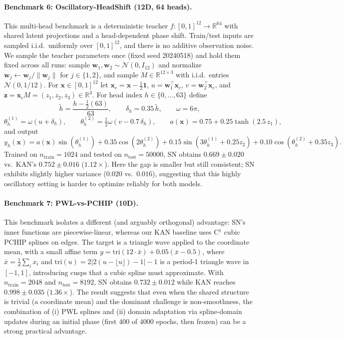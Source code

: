 \documentclass{article}
\theoremstyle{plain}
\theoremstyle{definition}
\theoremstyle{remark}
\begin{document}
\paragraph{Benchmark 6: Oscillatory-HeadShift (12D, 64 heads).}
This multi-head benchmark is a deterministic teacher $f:[0,1]^{12}\to\mathbb{R}^{64}$ with shared latent projections and a head-dependent phase shift. Train/test inputs are sampled i.i.d.\ uniformly over $[0,1]^{12}$, and there is no additive observation noise. We sample the teacher parameters once (fixed seed 20240518) and hold them fixed across all runs: sample $\mathbf{w}_1,\mathbf{w}_2\sim\mathcal{N}(0,I_{12})$ and normalize $\mathbf{w}_j\leftarrow \mathbf{w}_j/\|\mathbf{w}_j\|$ for $j\in\{1,2\}$, and sample $M\in\mathbb{R}^{12\times 3}$ with i.i.d.\ entries $\mathcal{N}(0,1/12)$. For $\mathbf{x}\in[0,1]^{12}$ let $\mathbf{x}_c=\mathbf{x}-\tfrac12\mathbf{1}$, $u=\mathbf{w}_1^\top \mathbf{x}_c$, $v=\mathbf{w}_2^\top \mathbf{x}_c$, and $\mathbf{z}=\mathbf{x}_c M=(z_1,z_2,z_3)\in\mathbb{R}^3$. For head index $h\in\{0,\dots,63\}$ define
$$\tilde{h}=\frac{h-\tfrac12(63)}{63},\qquad \delta_h = 0.35\,\tilde{h},\qquad \omega = 6\pi,$$
$$\theta^{(1)}_h=\omega(u+\delta_h),\qquad \theta^{(2)}_h=\tfrac12\omega(v-0.7\,\delta_h),\qquad a(\mathbf{x}) = 0.75+0.25\tanh(2.5\,z_1),$$
and output
$$y_h(\mathbf{x}) = a(\mathbf{x})\sin(\theta^{(1)}_h) + 0.35\cos(2\theta^{(2)}_h) + 0.15\sin(3\theta^{(1)}_h + 0.25 z_2) + 0.10\cos(\theta^{(2)}_h + 0.35 z_3).$$
Trained on $n_{\text{train}}=1024$ and tested on $n_{\text{test}}=50000$, SN obtains $0.669 \pm 0.020$ vs.\ KAN's $0.752 \pm 0.016$ ($1.12\times$). Here the gap is smaller but still consistent; SN exhibits slightly higher variance ($0.020$ vs.\ $0.016$), suggesting that this highly oscillatory setting is harder to optimize reliably for both models.

\paragraph{Benchmark 7: PWL-vs-PCHIP (10D).}
This benchmark isolates a different (and arguably orthogonal) advantage: SN's inner functions are piecewise-linear, whereas our KAN baseline uses C$^1$ cubic PCHIP splines on edges. The target is a triangle wave applied to the coordinate mean, with a small affine term $y=\mathrm{tri}(12 \cdot \bar{x}) + 0.05(\bar{x}-0.5)$, where $\bar{x}=\tfrac{1}{d}\sum_i x_i$ and $\mathrm{tri}(u)=2\left|2(u-\lfloor u\rfloor)-1\right|-1$ is a period-1 triangle wave in $[-1,1]$, introducing cusps that a cubic spline must approximate. With $n_{\text{train}}=2048$ and $n_{\text{test}}=8192$, SN obtains $0.732 \pm 0.012$ while KAN reaches $0.998 \pm 0.035$ ($1.36\times$). The result suggests that even when the shared structure is trivial (a coordinate mean) and the dominant challenge is non-smoothness, the combination of (i) PWL splines and (ii) domain adaptation via spline-domain updates during an initial phase (first $400$ of $4000$ epochs, then frozen) can be a strong practical advantage.
\end{document}

